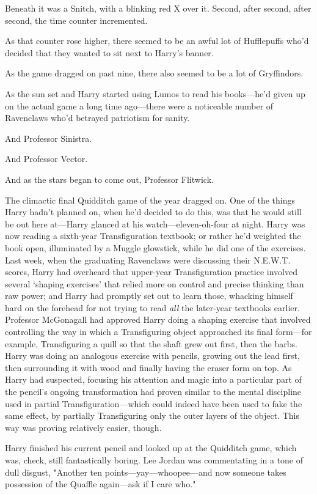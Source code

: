 Beneath it was a Snitch, with a blinking red X over it.
\sbreak
Second, after second, after second, the time counter incremented.

As that counter rose higher, there seemed to be an awful lot of Hufflepuffs
who'd decided that they wanted to sit next to Harry's banner.

As the game dragged on past nine, there also seemed to be a lot of Gryffindors.

As the sun set and Harry started using Lumos to read his books—he'd given up
on the actual game a long time ago—there were a noticeable number of
Ravenclaws who'd betrayed patriotism for sanity.

And Professor Sinistra.

And Professor Vector.

And as the stars began to come out, Professor Flitwick.

The climactic final Quidditch game of the year{\el} dragged on.
\sbreak
One of the things Harry hadn't planned on, when he'd decided to do this, was
that he would still be out here at—Harry glanced at his
watch—eleven-oh-four at night. Harry was now reading a sixth-year
Transfiguration textbook; or rather he'd weighted the book open, illuminated by
a Muggle glowstick, while he did one of the exercises. Last week, when the
graduating Ravenclaws were discussing their N.E.W.T. scores, Harry had
overheard that upper-year Transfiguration practice involved several `shaping
exercises' that relied more on control and precise thinking than raw power; and
Harry had promptly set out to learn those, whacking himself hard on the
forehead for not trying to read \emph{all} the later-year textbooks earlier.
Professor McGonagall had approved Harry doing a shaping exercise that involved
controlling the way in which a Transfiguring object approached its final
form—for example, Transfiguring a quill so that the shaft grew out first,
then the barbs. Harry was doing an analogous exercise with pencils, growing out
the lead first, then surrounding it with wood and finally having the eraser
form on top. As Harry had suspected, focusing his attention and magic into a
particular part of the pencil's ongoing transformation had proven similar to
the mental discipline used in partial Transfiguration—which could indeed have
been used to fake the same effect, by partially Transfiguring only the outer
layers of the object. This way was proving relatively easier, though.

Harry finished his current pencil and looked up at the Quidditch game, which
was, check, still fantastically boring. Lee Jordan was commentating in a tone
of dull disgust, "Another ten points—yay—whoopee—and now someone takes
possession of the Quaffle again—ask if I care who."

